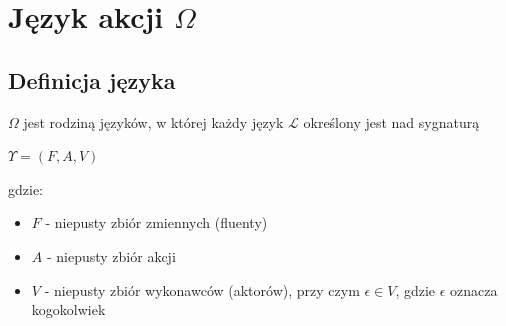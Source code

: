 \documentclass{article}
\begin{document}
\section{Język akcji $\Omega$}

\subsection{Definicja języka}
$\Omega$ jest rodziną języków, w której każdy język $\mathcal{L}$ określony jest nad sygnaturą 
\begin{center}
$\Upsilon=(F,A,V)$
\end{center}
gdzie: 
\begin{itemize}
\item $F$ - niepusty zbiór zmiennych (fluenty)
\item $A$ - niepusty zbiór akcji
\item $V$ - niepusty zbiór wykonawców (aktorów), przy czym $\epsilon\in V$, gdzie $\epsilon$ oznacza kogokolwiek
\end{itemize}
\end{document}
